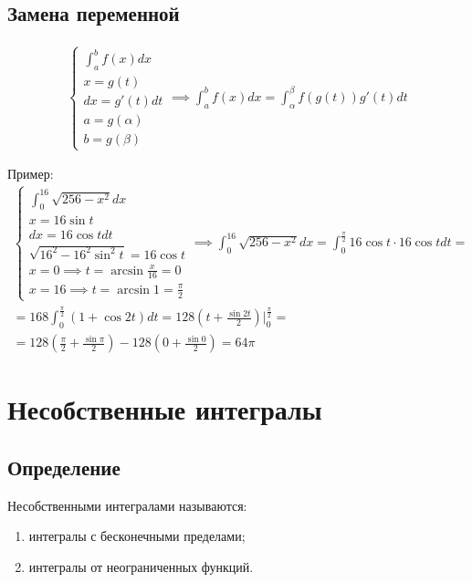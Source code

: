\documentclass[a4paper,12pt,oneside]{extbook}
\theoremstyle{numbered}
\theoremstyle{unnumbered}
\theoremstyle{named}
\theoremstyle{unnumbered}
\theoremstyle{named}
\theoremstyle{named}
\theoremstyle{named}
\begin{document}
\subsection{Замена переменной}%
\label{sub:Замена переменной}

\begin{gather*}
    \begin{cases}
        \int_a^b f(x)dx \\
        x = g(t)        \\
        dx = g'(t)dt    \\
        a = g(\alpha)   \\
        b = g(\beta)
    \end{cases}
    \implies
    \int_a^b f(x)dx = \int_\alpha^\beta f(g(t)) g'(t)dt
\end{gather*}

Пример:
\begin{gather*}
    \begin{cases}
        \int_0^{16} \sqrt{256 - x^2}dx               \\
        x = 16\sin{t}                                \\
        dx = 16\cos{t}dt                             \\
        \sqrt{16^2 - 16^2\sin^2{t}} = 16\cos{t}      \\
        x = 0 \implies t = \arcsin{\frac{x}{16}} = 0 \\
        x = 16 \implies t = \arcsin{1} = \frac{\pi}{2}
    \end{cases}
    \implies
    \int_0^{16} \sqrt{256 - x^2}dx = \int_0^{\frac{\pi}{2}} 16\cos{t} \cdot 16\cos{t}dt = \\
    = 168 \int_0^{\frac{\pi}{2}} (1 + \cos{2t})dt = 128(t + \frac{\sin{2t}}{2}) |_0^{\frac{\pi}{2}} = \\
    = 128(\frac{\pi}{2} + \frac{\sin{\pi}}{2}) - 128(0 + \frac{\sin{0}}{2}) = 64\pi
\end{gather*}


\section{Несобственные интегралы}%
\label{sec:Несобственные интегралы}

\subsection{Определение}%
\label{sub:Определение}

Несобственными интегралами называются:
\begin{enumerate}
    \item {интегралы с бесконечными пределами;}
    \item {интегралы от неограниченных функций.}
\end{enumerate}
\end{document}
